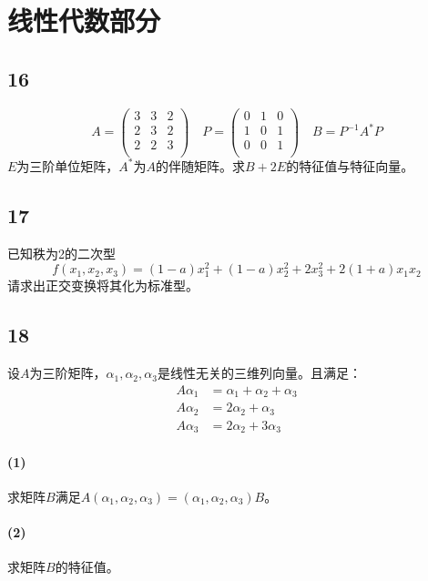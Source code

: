 \documentclass[a4paper,12pt]{article}
\begin{document}
\section*{线性代数部分}
\subsection*{16}
\begin{equation*}
	A = \begin{pmatrix}
	3&3&2\\2&3&2\\2&2&3\\	
	\end{pmatrix}\quad
P= \begin{pmatrix}
	0&1&0\\1&0&1\\0&0&1\\	
\end{pmatrix}\quad 
B=P^{-1}A^{*}P
\end{equation*}
$E$为三阶单位矩阵，$A^{*}$为$A$的伴随矩阵。求$B+2E$的特征值与特征向量。
\subsection*{17}
\noindent 已知秩为2的二次型
\begin{equation*}
	f(x_{1},x_{2},x_{3})=\left(1-a\right)x_{1}^2+\left(1-a\right)x_{2}^2+2x_{3}^2+2(1+a)x_{1}x_{2}
\end{equation*}
请求出正交变换将其化为标准型。
\subsection*{18}
\noindent 设$A$为三阶矩阵，$\alpha_{1},\alpha_{2},\alpha_{3}$是线性无关的三维列向量。且满足：
\begin{equation*}
	\begin{aligned}
		A\alpha_{1}&=\alpha_{1}+\alpha_{2}+\alpha_{3}\\
		A\alpha_{2}&=2\alpha_{2}+\alpha_{3}\\
		A\alpha_{3}&=2\alpha_{2}+3\alpha_{3}
	\end{aligned}
\end{equation*}
\paragraph{(1)}求矩阵$B$满足$A\left(\alpha_{1},\alpha_{2},\alpha_{3}\right)=\left(\alpha_{1},\alpha_{2},\alpha_{3}\right)B$。
\paragraph{(2)}求矩阵$B$的特征值。
\end{document}
